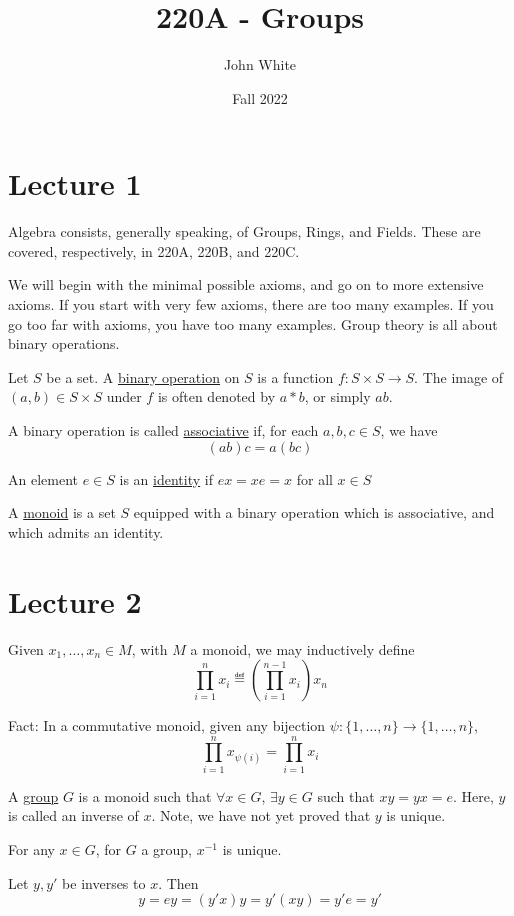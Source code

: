 \documentclass[x11names,reqno,14pt]{extarticle}
\title{220A - Groups}
\author{John White}
\date{Fall 2022}
\begin{document}
\section*{Lecture 1}

Algebra consists, generally speaking, of Groups, Rings, and Fields. These are covered, respectively, in 220A, 220B, and 220C. 


We will begin with the minimal possible axioms, and go on to more extensive axioms. If you start with very few axioms, there are too many examples. If you go too far with axioms, you have too many examples. Group theory is all about binary operations. 


Let $S$ be a set. A \underline{binary operation} on $S$ is a function $f:S\times S \to S$. The image of $(a, b) \in S \times S$ under $f$ is often denoted by $a * b$, or simply $ab$. 

 
A binary operation is called \underline{associative} if, for each $a, b, c \in S$, we have 
\[
(ab)c = a(bc)
\]


An element $e \in S$ is an \underline{identity} if $ex = xe = x$ for all $x \in S$

A \underline{monoid} is a set $S$ equipped with a binary operation which is associative, and which admits an identity. 

\section*{Lecture 2}

Given $x_1, \dots, x_n \in M$, with $M$ a monoid, we may inductively define
\[
\prod_{i=1}^nx_i \eqdef(\prod_{i=1}^{n - 1}x_i)x_n
\]

Fact: In a commutative monoid, given any bijection $\psi:\{1,\dots,n\}\to\{1,\dots,n\}$, 
\[
\prod_{i=1}^nx_{\psi(i)} = \prod_{i=1}^nx_i
\]


A \underline{group} $G$ is a monoid such that $\forall x \in G$, $\exists y \in G$ such that $xy = yx = e$. Here, $y$ is called an inverse of $x$. Note, we have not yet proved that $y$ is unique. 

\claim

For any $x \in G$, for $G$ a group, $x^{-1}$ is unique. 

\proof

Let $y, y'$ be inverses to $x$. Then 
\[
y = ey = (y'x)y = y'(xy) = y'e = y'
\]
\end{document}
